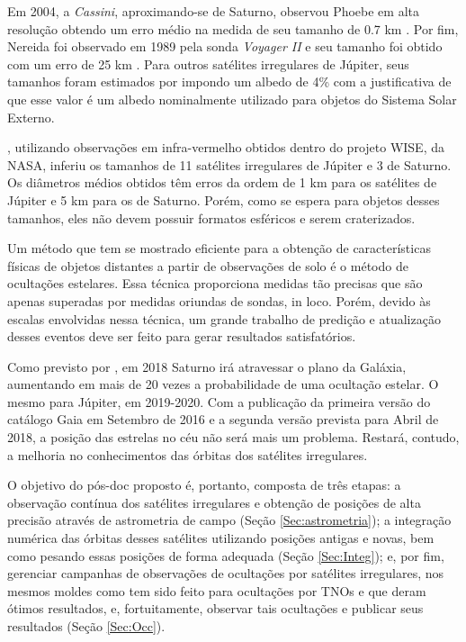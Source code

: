 \documentclass[12pt,a4paper]{report}
\begin{document}
Em 2004, a \textit{Cassini}, aproximando-se de Saturno, observou Phoebe em alta resolução obtendo um erro médio na medida de seu tamanho de 0.7 km \citep{Thomas2010}. Por fim, Nereida foi observado em 1989 pela sonda \textit{Voyager II} e seu tamanho foi obtido com um erro de 25 km \citep{Smith1989}. Para outros satélites irregulares de Júpiter, seus tamanhos foram estimados por \cite{Rettig2001} impondo um albedo de 4\% com a justificativa de que esse valor é um albedo nominalmente utilizado para objetos do Sistema Solar Externo.

\cite{Grav2015}, utilizando observações em infra-vermelho obtidos dentro do projeto WISE, da NASA, inferiu os tamanhos de 11 satélites irregulares de Júpiter e 3 de Saturno. Os diâmetros médios obtidos têm erros da ordem de 1 km para os satélites de Júpiter e 5 km para os de Saturno. Porém, como se espera para objetos desses tamanhos, eles não devem possuir formatos esféricos e serem craterizados.

Um método que tem se mostrado eficiente para a obtenção de características físicas de objetos distantes a partir de observações de solo é o método de ocultações estelares. Essa técnica proporciona medidas tão precisas que são apenas superadas por medidas oriundas de sondas, in loco. Porém, devido às escalas envolvidas nessa técnica, um grande trabalho de predição e atualização desses eventos deve ser feito para gerar resultados satisfatórios.

Como previsto por \cite{GomesJunior2016}, em 2018 Saturno irá atravessar o plano da Galáxia, aumentando em mais de 20 vezes a probabilidade de uma ocultação estelar. O mesmo para Júpiter, em 2019-2020. Com a publicação da primeira versão do catálogo Gaia em Setembro de 2016 e a segunda versão prevista para Abril de 2018, a posição das estrelas no céu não será mais um problema. Restará, contudo, a melhoria no conhecimentos das órbitas dos satélites irregulares.

O objetivo do pós-doc proposto é, portanto, composta de três etapas: a observação contínua dos satélites irregulares e obtenção de posições de alta precisão através de astrometria de campo (Seção \ref{Sec:astrometria}); a integração numérica das órbitas desses satélites utilizando posições antigas e novas, bem como pesando essas posições de forma adequada (Seção \ref{Sec:Integ}); e, por fim, gerenciar campanhas de observações de ocultações por satélites irregulares, nos mesmos moldes como tem sido feito para ocultações por TNOs e que deram ótimos resultados, e, fortuitamente, observar tais ocultações e publicar seus resultados (Seção \ref{Sec:Occ}).
\end{document}
